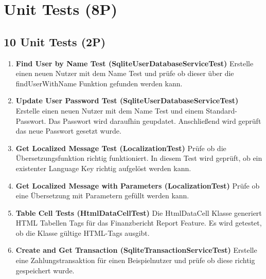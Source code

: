 \newcommand{\unittitle}[2]{\textbf{#1 (#2)}\newline}


\section{Unit Tests (8P)}
\subsection{10 Unit Tests (2P)}
\begin{enumerate}
    \item \unittitle{Find User by Name Test}{SqliteUserDatabaseServiceTest}
Erstelle einen neuen Nutzer mit dem Name Test und prüfe ob dieser über die findUserWithName Funktion gefunden werden kann. 
    
    \item \unittitle{Update User Password Test}{SqliteUserDatabaseServiceTest}
Erstelle einen neuen Nutzer mit dem Name Test und einem Standard-Passwort. Das Passwort wird daraufhin geupdatet. Anschließend wird geprüft das neue Passwort gesetzt wurde.  
    
    \item \unittitle{Get Localized Message Test}{LocalizationTest}
Prüfe ob die Übersetzungsfunktion richtig funktioniert. In diesem Test wird geprüft, ob ein existenter Language Key richtig aufgelöst werden kann.
    
    \item \unittitle{Get Localized Message with Parameters}{LocalizationTest}
Prüfe ob eine Übersetzung mit Parametern gefüllt werden kann. 
    

    \item \unittitle{Table Cell Tests}{HtmlDataCellTest}
Die HtmlDataCell Klasse generiert HTML Tabellen Tags für das Finanzbericht Report Feature. Es wird getestet, ob die Klasse gültige HTML-Tags ausgibt. 
    
    \item \unittitle{Create and Get Transaction}{SqliteTransactionServiceTest}
Erstelle eine Zahlungstransaktion für einen Beispielnutzer und prüfe ob diese richtig gespeichert wurde. 
    


\end{enumerate}
